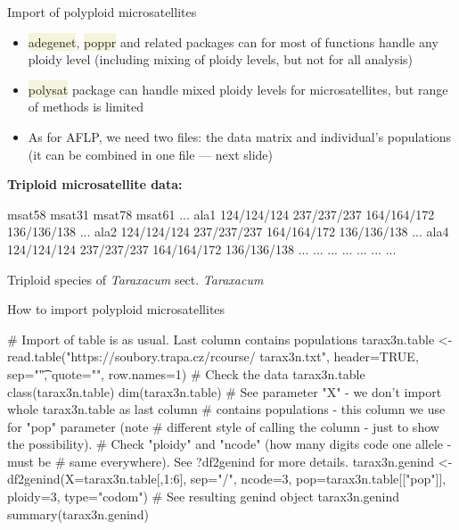 \documentclass[compress, xelatex, 11pt, xcolor=svgnames, aspectratio=169, url={hyphens, lowtilde}]{beamer}
\renewcommand{\texttt}[1]{\colorbox{Beige}{{\ttfamily #1}}}
\begin{document}
\begin{frame}[fragile]{Import of polyploid microsatellites}
	\vfill
	\begin{itemize}
		\item \texttt{adegenet}, \texttt{poppr} and related packages can for most of functions handle any ploidy level (including mixing of ploidy levels, but not for all analysis)
		\item \texttt{polysat} package can handle mixed ploidy levels for microsatellites, but range of methods is limited
		\item As for AFLP, we need two files: the data matrix and individual's populations (it can be combined in one file --- next slide)
	\end{itemize}
	\vfill
	\textbf{Triploid microsatellite data:}
	\vfil
	\begin{spluscode}
              msat58      msat31      msat78      msat61 ...
    ala1 124/124/124 237/237/237 164/164/172 136/136/138 ...
    ala2 124/124/124 237/237/237 164/164/172 136/136/138 ...
    ala4 124/124/124 237/237/237 164/164/172 136/136/138 ...
     ...         ...         ...         ...         ... ...
	\end{spluscode}
	\vfill
	\begin{footnotesize}
		Triploid species of \textit{Taraxacum} sect. \textit{Taraxacum}
	\end{footnotesize}
	\vfill
\end{frame}

\begin{frame}[fragile]{How to import polyploid microsatellites}
	\begin{spluscode}
    # Import of table is as usual. Last column contains populations
    tarax3n.table <- read.table("https://soubory.trapa.cz/rcourse/
      tarax3n.txt", header=TRUE, sep="\t", quote="", row.names=1)
    # Check the data
    tarax3n.table
    class(tarax3n.table)
    dim(tarax3n.table)
    # See parameter "X" - we don't import whole tarax3n.table as last column
    # contains populations - this column we use for "pop" parameter (note
    # different style of calling the column - just to show the possibility).
    # Check "ploidy" and "ncode" (how many digits code one allele - must be
    # same everywhere). See ?df2genind for more details.
    tarax3n.genind <- df2genind(X=tarax3n.table[,1:6], sep="/", ncode=3,
      pop=tarax3n.table[["pop"]], ploidy=3, type="codom")
    # See resulting genind object
    tarax3n.genind
    summary(tarax3n.genind)
	\end{spluscode}
\end{frame}
\end{document}
